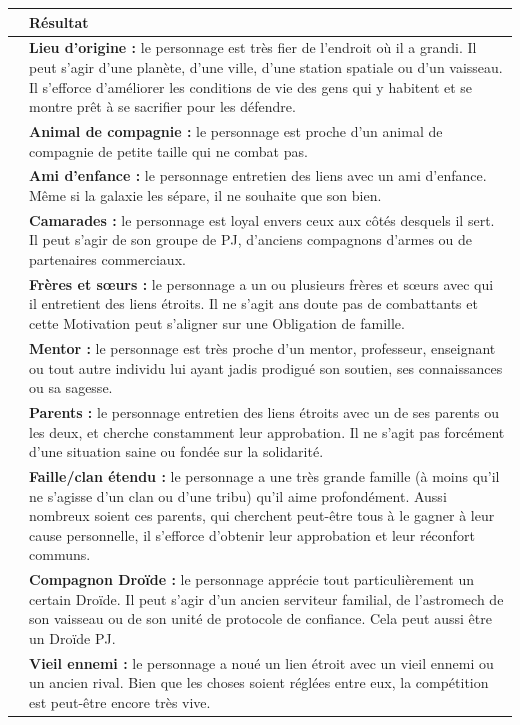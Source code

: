 \documentclass[twoside]{article}
\begin{document}
\begin{table}[h]
	\centering
	\begin{tabular}{|m{2cm}|m{13cm}|}
		\hline
		\centering{\cellcolor{DarkRed} {\large \textcolor{PureWhite}{\textbf{D100}}}} & \cellcolor{DarkRed} {\large \textcolor{PureWhite}{\textbf{Résultat}}} \\
		\hline
		\centering{01 - 10} & \textbf{Lieu d'origine :} le personnage est très fier de l'endroit où il a grandi. Il peut s'agir d'une planète, d'une ville, d'une station spatiale ou d'un vaisseau. Il s'efforce d'améliorer les conditions de vie des gens qui y habitent et se montre prêt à se sacrifier pour les défendre. \\
		\hline
		\centering{11 - 20} & \textbf{Animal de compagnie :} le personnage est proche d'un animal de compagnie de petite taille qui ne combat pas. \\
		\hline
		\centering{21 - 30} & \textbf{Ami d'enfance :} le personnage entretien des liens avec un ami d'enfance. Même si la galaxie les sépare, il ne souhaite que son bien. \\
		\hline
		\centering{31 - 40} & \textbf{Camarades :} le personnage est loyal envers ceux aux côtés desquels il sert. Il peut s'agir de son groupe de PJ, d'anciens compagnons d'armes ou de partenaires commerciaux. \\
		\hline
		\centering{41 - 50} & \textbf{Frères et sœurs :} le personnage a un ou plusieurs frères et sœurs avec qui il entretient des liens étroits. Il ne s'agit ans doute pas de combattants et cette Motivation peut s'aligner sur une Obligation de famille. \\
		\hline
		\centering{51 - 60} & \textbf{Mentor :} le personnage est très proche d'un mentor, professeur, enseignant ou tout autre individu lui ayant jadis prodigué son soutien, ses connaissances ou sa sagesse. \\
		\hline
		\centering{61 - 70} & \textbf{Parents :} le personnage entretien des liens étroits avec un de ses parents ou les deux, et cherche constamment leur approbation. Il ne s'agit pas forcément d'une situation saine ou fondée sur la solidarité. \\
		\hline
		\centering{71 - 80} & \textbf{Faille/clan étendu :} le personnage a une très grande famille (à moins qu'il ne s'agisse d'un clan ou d'une tribu) qu'il aime profondément. Aussi nombreux soient ces parents, qui cherchent peut-être tous à le gagner à leur cause personnelle, il s'efforce d'obtenir leur approbation et leur réconfort communs. \\
		\hline
		\centering{81 - 90} & \textbf{Compagnon Droïde :} le personnage apprécie tout particulièrement un certain Droïde. Il peut s'agir d'un ancien serviteur familial, de l'astromech de son vaisseau ou de son unité de protocole de confiance. Cela peut aussi être un Droïde PJ. \\
		\hline
		\centering{91 - 00} & \textbf{Vieil ennemi :} le personnage a noué un lien étroit avec un vieil ennemi ou un ancien rival. Bien que les choses soient réglées entre eux, la compétition est peut-être encore très vive. \\
		\hline
	\end{tabular}
\end{table}
\end{document}
